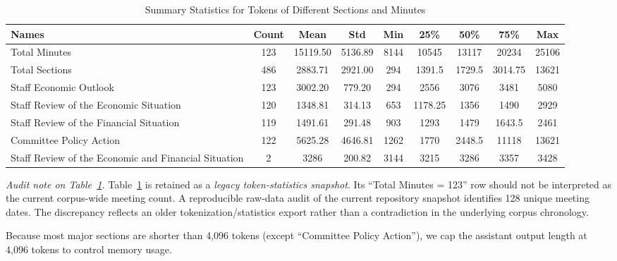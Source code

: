 \begin{table}[htbp]
    \scriptsize
    \centering
    \begin{tabular}{p{3.8cm}cccccccc}
        \toprule
        Names&                                                Count&	    Mean&	    Std&	 Min&	   25\%&	  50\%&	   75\%&	Max \\
        \hline
        Total Minutes&	                                        123&	15119.50&	5136.89&	8144&	  10545&	 13117&	  20234&	25106 \\
        Total Sections&	                                        486&	 2883.71&	2921.00&	 294&	 1391.5&	1729.5&	3014.75&	13621\\
        Staff Economic Outlook&	                                123&	 3002.20&	 779.20&	 294&	   2556&	  3076&	   3481&	5080 \\
        Staff Review of the Economic Situation&	                120&	 1348.81&	 314.13&	 653&	1178.25&	  1356&	   1490&	2929 \\
        Staff Review of the Financial Situation&	            119&	 1491.61&	 291.48&	 903&	   1293&	  1479&	 1643.5&	2461 \\
        Committee Policy Action&	                            122&	 5625.28&	4646.81&	1262&	   1770&	2448.5&	  11118&	13621 \\
        Staff Review of the Economic and Financial Situation&	  2&	    3286&	 200.82&	3144&	   3215&	  3286&	   3357&	3428 \\
        \bottomrule
    \end{tabular}
    \caption{Summary Statistics for Tokens of Different Sections and Minutes}
    \label{tab:ch2:summary_statis}
\end{table}

\noindent\textit{Audit note on Table~\ref{tab:ch2:summary_statis}.}
Table~\ref{tab:ch2:summary_statis} is retained as a \textit{legacy token-statistics snapshot}. Its ``Total Minutes = 123'' row should not be interpreted as the current corpus-wide meeting count. A reproducible raw-data audit of the current repository snapshot identifies 128 unique meeting dates. The discrepancy reflects an older tokenization/statistics export rather than a contradiction in the underlying corpus chronology.


Because most major sections are shorter than 4,096 tokens (except ``Committee Policy Action''), we cap the assistant output length at 4,096 tokens to control memory usage.


